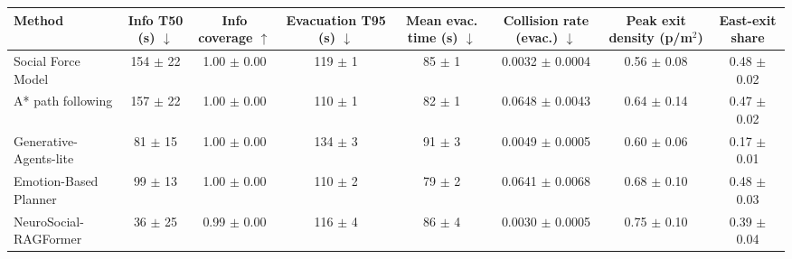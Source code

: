\begin{tabular}{lccccccc}\toprule
Method & Info T50 (s) $\downarrow$ & Info coverage $\uparrow$ & Evacuation T95 (s) $\downarrow$ & Mean evac. time (s) $\downarrow$ & Collision rate (evac.) $\downarrow$ & Peak exit density (p/m$^2$) & East-exit share \\ \midrule
Social Force Model & 154 $\pm$ 22 & 1.00 $\pm$ 0.00 & 119 $\pm$ 1 & 85 $\pm$ 1 & 0.0032 $\pm$ 0.0004 & 0.56 $\pm$ 0.08 & 0.48 $\pm$ 0.02 \\
A* path following & 157 $\pm$ 22 & 1.00 $\pm$ 0.00 & 110 $\pm$ 1 & 82 $\pm$ 1 & 0.0648 $\pm$ 0.0043 & 0.64 $\pm$ 0.14 & 0.47 $\pm$ 0.02 \\
Generative-Agents-lite & 81 $\pm$ 15 & 1.00 $\pm$ 0.00 & 134 $\pm$ 3 & 91 $\pm$ 3 & 0.0049 $\pm$ 0.0005 & 0.60 $\pm$ 0.06 & 0.17 $\pm$ 0.01 \\
Emotion-Based Planner & 99 $\pm$ 13 & 1.00 $\pm$ 0.00 & 110 $\pm$ 2 & 79 $\pm$ 2 & 0.0641 $\pm$ 0.0068 & 0.68 $\pm$ 0.10 & 0.48 $\pm$ 0.03 \\
NeuroSocial-RAGFormer & 36 $\pm$ 25 & 0.99 $\pm$ 0.00 & 116 $\pm$ 4 & 86 $\pm$ 4 & 0.0030 $\pm$ 0.0005 & 0.75 $\pm$ 0.10 & 0.39 $\pm$ 0.04 \\
\bottomrule\end{tabular}